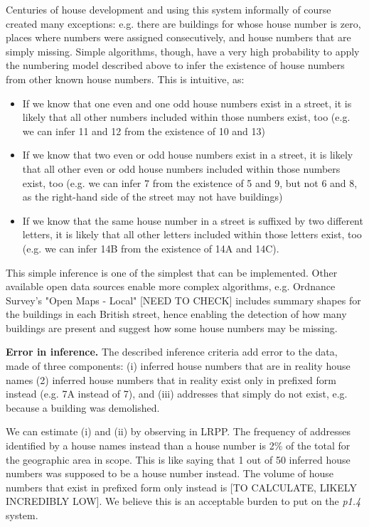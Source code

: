         Centuries of house development and using this system informally of course created many exceptions: e.g. there are buildings for whose house number is zero, places where numbers were assigned consecutively, and house numbers that are simply missing. Simple algorithms, though, have a very high probability to apply the numbering model described above to infer the existence of house numbers from other known house numbers. This is intuitive, as: 
        \begin{itemize}
            \item If we know that one even and one odd house numbers exist in a street, it is likely that all other numbers included within those numbers exist, too (e.g. we can infer 11 and 12 from the existence of 10 and 13)
            \item If we know that two even or odd house numbers exist in a street, it is likely that all other even or odd house numbers included within those numbers exist, too (e.g. we can infer 7 from the existence of 5 and 9, but not 6 and 8, as the right-hand side of the street may not have buildings)
            \item If we know that the same house number in a street is suffixed by two different letters, it is likely that all other letters included within those letters exist, too (e.g. we can infer 14B from the existence of 14A and 14C).
        \end{itemize}
        
        This simple inference is one of the simplest that can be implemented. Other available open data sources enable more complex algorithms, e.g. Ordnance Survey's "Open Maps - Local" [NEED TO CHECK] includes summary shapes for the buildings in each British street, hence enabling the detection of how many buildings are present and suggest how some house numbers may be missing.
        
        {\bf Error in inference.} The described inference criteria add error to the data, made of three components: (i) inferred house numbers that are in reality house names (2) inferred house numbers that in reality exist only in prefixed form instead (e.g. 7A instead of 7), and (iii) addresses that simply do not exist, e.g. because a building was demolished.
        
        We can estimate (i) and (ii) by observing in LRPP. The frequency of addresses identified by a house names instead than a house number is 2\% of the total for the geographic area in scope. This is like saying that 1 out of 50 inferred house numbers was supposed to be a house number instead. The volume of house numbers that exist in prefixed form only instead is [TO CALCULATE, LIKELY INCREDIBLY LOW]. We believe this is an acceptable burden to put on the {\it p1.4} system. 
        
